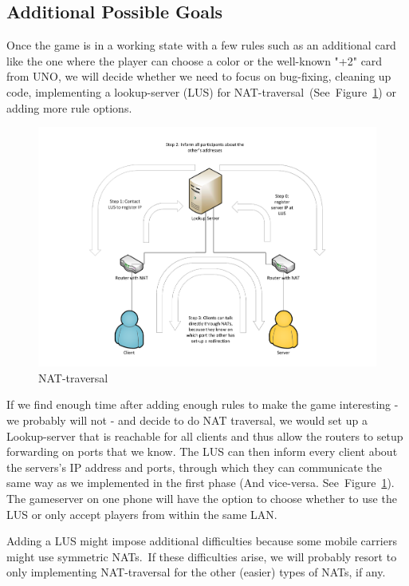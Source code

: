 \documentclass{sig-alternate}
\newcommand{\lfig}[1]{\label{fig:#1}}
\newcommand{\rfig}[1]{Figure~\ref{fig:#1}}
\begin{document}
\subsection{Additional Possible Goals}
Once the game is in a working state with a few rules such as an additional card like the one where the player can choose a color or the well-known "+2" card from UNO, we will decide whether we need to focus on bug-fixing, cleaning up code, implementing a lookup-server (LUS) for NAT-traversal~(See~\rfig{nat}) or adding more rule options. 

\begin{figure}[!htbp]
	\centering
    \includegraphics[width=\columnwidth]{NATholepunching.pdf}
    \vspace{-5mm} %
	\caption{NAT-traversal}
	\lfig{nat}
\end{figure}

If we find enough time after adding enough rules to make the game interesting - we probably will not - and decide to do NAT traversal, we would set up a Lookup-server that is reachable for all clients and thus allow the routers to setup forwarding on ports that we know. The LUS can then inform every client about the servers's IP address and ports, through which they can communicate the same way as we implemented in the first phase (And vice-versa. See~\rfig{nat}). The gameserver on one phone will have the option to choose whether to use the LUS or only accept players from within the same LAN.

Adding a LUS might impose additional difficulties because some mobile carriers might use symmetric NATs.~\cite{natwiki}If these difficulties arise, we will probably resort to only implementing NAT-traversal for the other (easier) types of NATs, if any.
\end{document}
